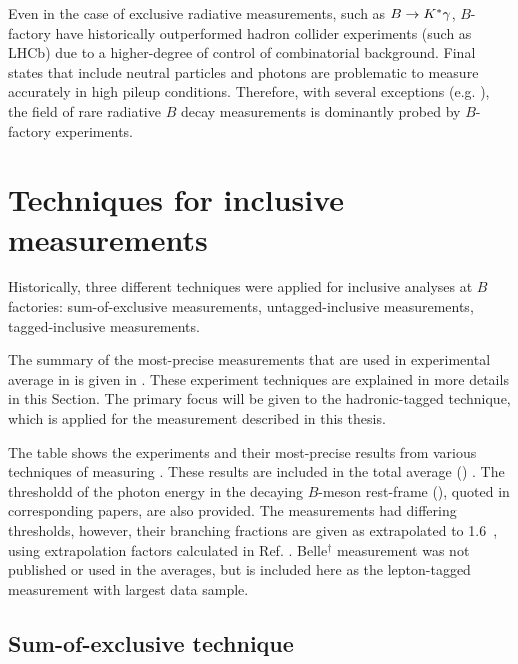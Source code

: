 Even in the case of exclusive radiative measurements, such as $B\rightarrow K^*\gamma$, $B$-factory have historically outperformed hadron collider experiments (such as LHCb) due to a higher-degree of control of combinatorial background.
Final states that include neutral particles and photons are problematic to measure accurately in high pileup conditions.
Therefore, with several exceptions (e.g. \cite{Bellee:2019qbt}), the field of rare radiative $B$ decay measurements is dominantly probed by $B$-factory experiments.



\section{Techniques for inclusive \safeBtoXsgamma measurements}\label{sec:btosgamma_techniques}
Historically, three different techniques were applied for inclusive \BtoXsgamma analyses at $B$ factories: 
sum-of-exclusive measurements,
untagged-inclusive measurements,
tagged-inclusive measurements.

The summary of the most-precise measurements that are used in experimental average in  is given in .
These experiment techniques are explained in more details in this Section.
The primary focus will be given to the hadronic-tagged technique, which is applied for the measurement described in this thesis.

{\renewcommand{\arraystretch}{1.2}
 \begin{table}[!htbp]
     \centering
     \caption{\label{tab:btosgamma_inclusive_summary}
     The table shows the experiments and their most-precise results from various techniques of measuring \BtoXsgamma.
     These results are included in the total \BtoXsgamma average () \cite{Amhis:2022mac,Workman:2022ynf}.
     The thresholdd of the photon energy in the decaying $B$-meson rest-frame (\EB), quoted in corresponding papers, are also provided.
     The measurements had differing thresholds, however, their branching fractions are given as extrapolated to 1.6~\gev, using extrapolation factors calculated in Ref. \cite{Buchmuller:2005zv}.
     Belle$^{\dagger}$ measurement was not published or used in the averages, but is included here as the lepton-tagged measurement with largest data sample.
     }
     
 \end{table}
 }

\subsection{Sum-of-exclusive technique}\label{sec:sum_of_exclusive}

